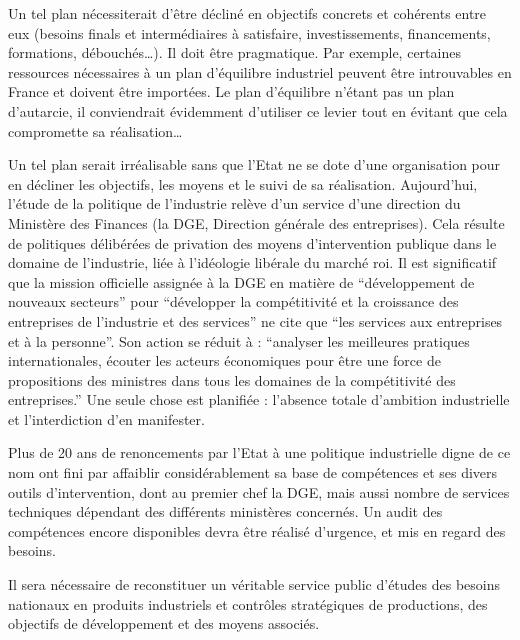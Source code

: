 \documentclass[a4paper]{article}
\begin{document}
Un tel plan nécessiterait d’être décliné en objectifs concrets et cohérents entre eux (besoins finals et intermédiaires à satisfaire, investissements, financements, formations, débouchés…).  Il doit être pragmatique. Par exemple, certaines ressources nécessaires à un plan d’équilibre industriel peuvent être introuvables en France et doivent être importées. Le plan d’équilibre n’étant pas un plan d’autarcie, il conviendrait évidemment d’utiliser ce levier tout en évitant que cela compromette sa réalisation…

Un tel plan serait irréalisable sans que l’Etat ne se dote d’une organisation pour en décliner les objectifs, les moyens et le suivi de sa réalisation. Aujourd’hui, l’étude de la politique de l’industrie relève d’un service d’une direction du Ministère des Finances (la DGE, Direction générale des entreprises). Cela résulte de politiques délibérées de privation des moyens d’intervention publique dans le domaine de l’industrie, liée à l’idéologie libérale du marché roi. Il est significatif que la mission officielle assignée à la DGE en matière de “développement de nouveaux secteurs” pour “développer la compétitivité et la croissance des entreprises de l’industrie et des services” ne cite que “les services aux entreprises et à la personne”. Son action se réduit à : “analyser les meilleures pratiques internationales, écouter les acteurs économiques pour être une force de propositions des ministres dans tous les domaines de la compétitivité des entreprises.” Une seule chose est planifiée : l’absence totale d’ambition industrielle et l’interdiction d’en manifester.

Plus de 20 ans de renoncements par l’Etat à une politique industrielle digne de ce nom ont fini par affaiblir considérablement sa base de compétences et ses divers outils d’intervention, dont au premier chef la DGE, mais aussi nombre de services techniques dépendant des différents ministères concernés. Un audit des compétences encore disponibles devra être réalisé d’urgence, et mis en regard des besoins.

Il sera nécessaire de reconstituer un véritable service public d’études des besoins nationaux en produits industriels et contrôles stratégiques de productions, des objectifs de développement et des moyens associés.
\end{document}
